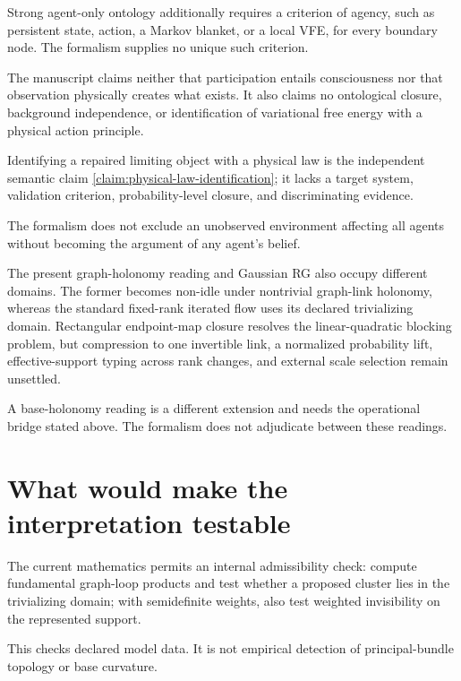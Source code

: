 Strong agent-only ontology additionally requires a
criterion of agency, such as persistent state, action, a Markov blanket, or a
local VFE, for every boundary node. The formalism supplies no unique such
criterion. 

The manuscript claims neither that participation entails consciousness nor
that observation physically creates what exists.  It also claims no
ontological closure, background independence, or identification of
variational free energy with a physical action principle.

Identifying a repaired limiting object with a physical
law is the independent semantic claim
\ref{claim:physical-law-identification}; it lacks a target system, validation
criterion, probability-level closure, and discriminating evidence.

The formalism does not exclude an unobserved environment affecting all agents
without becoming the argument of any agent's belief. 

The present graph-holonomy reading and Gaussian RG also occupy different
domains.  The former becomes non-idle under nontrivial graph-link holonomy,
whereas the standard fixed-rank iterated flow uses its declared trivializing
domain.  Rectangular endpoint-map closure resolves the linear-quadratic
blocking problem, but compression to one invertible link, a normalized
probability lift, effective-support typing across rank changes, and external
scale selection remain unsettled. 

A base-holonomy reading is a different extension and needs the operational
bridge stated above. The formalism does not adjudicate between these readings.

\section{What would make the interpretation testable}
\label{sec:phil-testable}

The current mathematics permits an internal admissibility check: compute
fundamental graph-loop products and test whether a proposed cluster lies in
the trivializing domain; with semidefinite weights, also test weighted
invisibility on the represented support. 

This checks declared model data. It is not empirical detection of
principal-bundle topology or base curvature. 

